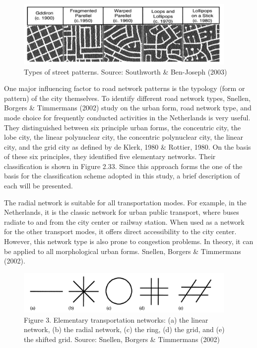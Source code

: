 \begin{figure}[h]
\centering
\includegraphics[width=0.95\textwidth,center]{picture/figure2.png}
\caption[Miniaturtrichter]{Types of street patterns. Source: Southworth \& Ben-Joseph (2003)}
\label{fig:streetpatterns}
\end{figure}

One major influencing factor to road network patterns is the typology (form or pattern) of the city themselves. To identify different road network types, Snellen, Borgers \& Timmermans (2002) study on the urban form, road network type, and mode choice for frequently conducted activities in the Netherlands is very useful. They distinguished between six principle urban forms, the concentric city, the lobe city, the linear polynuclear city, the concentric polynuclear city, the linear city, and the grid city as defined by de Klerk, 1980 \& Rottier, 1980. On the basis of these six principles, they identified five elementary networks. Their classification is shown in Figure 2.33. Since this approach forms the one of the basis for the classification scheme adopted in this study, a brief description of each will be presented.

The radial network is suitable for all transportation modes. For example, in the Netherlands, it is the classic network for urban public transport, where buses radiate to and from the city center or railway station. When used as a network for the other transport modes, it offers direct accessibility to the city center. However, this network type is also prone to congestion problems. In theory, it can be applied to all morphological urban forms. Snellen, Borgers \& Timmermans (2002).

\begin{figure}[h]
\centering
\includegraphics[width=0.95\textwidth,center]{picture/figure3.png}
\caption[Miniaturtrichter]{Figure 3. Elementary transportation networks: (a) the linear network, (b) the radial network, (c) the ring, (d) the grid, and (e) the shifted grid.  Source: Snellen, Borgers \& Timmermans (2002)}
\label{fig:transportnetworks}
\end{figure}

